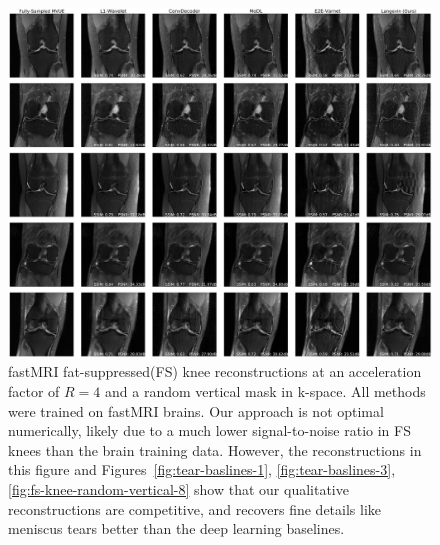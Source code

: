 \documentclass{article}
\begin{document}
\begin{figure}
    \centering
    \includegraphics[width=\columnwidth]{fs-random-vertical-R=4-comp.pdf}
    \caption{\small fastMRI fat-suppressed(FS) knee reconstructions at an acceleration factor of $R=4$ and a random vertical mask in k-space. All methods were trained on fastMRI brains. Our approach is not optimal numerically, likely due to a much lower signal-to-noise ratio in FS knees than the brain training data. However, the reconstructions in this figure and Figures~\ref{fig:tear-baslines-1}, \ref{fig:tear-baslines-3}, \ref{fig:fs-knee-random-vertical-8} show that our qualitative reconstructions are competitive, and recovers fine details like meniscus tears better than the deep learning baselines.}
    \label{fig:fs-knee-random-vertical-4}
\end{figure}
\end{document}
